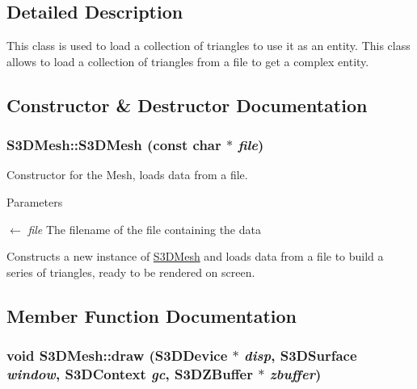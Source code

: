 \subsection{Detailed Description}
This class is used to load a collection of triangles to use it as an entity. This class allows to load a collection of triangles from a file to get a complex entity. 

\subsection{Constructor \& Destructor Documentation}
\hypertarget{class_s3_d_mesh_a810cf0f60312bc574e347d6248499258}{
\subsubsection[{S3DMesh}]{\setlength{\rightskip}{0pt plus 5cm}S3DMesh::S3DMesh (const char $\ast$ {\em file})}}
\label{class_s3_d_mesh_a810cf0f60312bc574e347d6248499258}


Constructor for the Mesh, loads data from a file. 


\begin{DoxyParams}{Parameters}
\item[\mbox{$\leftarrow$} {\em file}]The filename of the file containing the data\end{DoxyParams}
Constructs a new instance of \hyperlink{class_s3_d_mesh}{S3DMesh} and loads data from a file to build a series of triangles, ready to be rendered on screen. 

\subsection{Member Function Documentation}
\hypertarget{class_s3_d_mesh_afc47824c491991604931f4ccb0520cd1}{
\subsubsection[{draw}]{\setlength{\rightskip}{0pt plus 5cm}void S3DMesh::draw ({\bf S3DDevice} $\ast$ {\em disp}, \/  {\bf S3DSurface} {\em window}, \/  {\bf S3DContext} {\em gc}, \/  {\bf S3DZBuffer} $\ast$ {\em zbuffer})}}
\label{class_s3_d_mesh_afc47824c491991604931f4ccb0520cd1}


